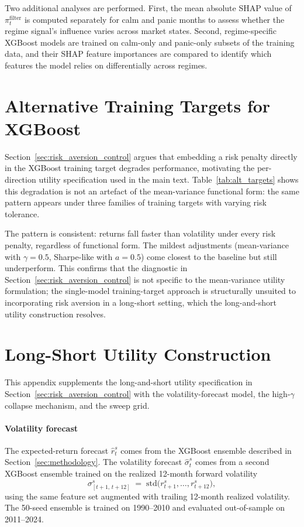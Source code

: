 Two additional analyses are performed. First, the mean absolute SHAP value of $\pi_t^{\text{filter}}$ is computed separately for calm and panic months to assess whether the regime signal's influence varies across market states. Second, regime-specific XGBoost models are trained on calm-only and panic-only subsets of the training data, and their SHAP feature importances are compared to identify which features the model relies on differentially across regimes.

\section{Alternative Training Targets for XGBoost}\label{app:alt_targets}

Section~\ref{sec:risk_aversion_control} argues that embedding a risk penalty directly in the XGBoost training target degrades performance, motivating the per-direction utility specification used in the main text. Table~\ref{tab:alt_targets} shows this degradation is not an artefact of the mean-variance functional form: the same pattern appears under three families of training targets with varying risk tolerance.



The pattern is consistent: returns fall faster than volatility under every risk penalty, regardless of functional form. The mildest adjustments (mean-variance with $\gamma = 0.5$, Sharpe-like with $a = 0.5$) come closest to the baseline but still underperform. This confirms that the diagnostic in Section~\ref{sec:risk_aversion_control} is not specific to the mean-variance utility formulation; the single-model training-target approach is structurally unsuited to incorporating risk aversion in a long-short setting, which the long-and-short utility construction resolves.

\section{Long-Short Utility Construction}\label{app:crra_construction}

This appendix supplements the long-and-short utility specification in Section~\ref{sec:risk_aversion_control} with the volatility-forecast model, the high-$\gamma$ collapse mechanism, and the sweep grid.

\paragraph{Volatility forecast} The expected-return forecast $\hat r_t^s$ comes from the XGBoost ensemble described in Section~\ref{sec:methodology}. The volatility forecast $\hat\sigma_t^s$ comes from a second XGBoost ensemble trained on the realized 12-month forward volatility
\[
    \sigma^s_{[t+1,\,t+12]} \;=\; \mathrm{std}\!\big(r^s_{t+1}, \ldots, r^s_{t+12}\big),
\]
using the same feature set augmented with trailing 12-month realized volatility. The 50-seed ensemble is trained on 1990--2010 and evaluated out-of-sample on 2011--2024.

